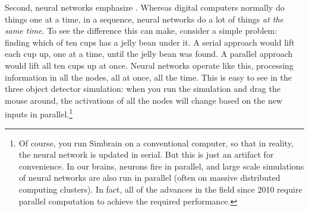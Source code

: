 Second, neural networks emphasize . Whereas digital computers normally do things one at a time, in a sequence, neural networks do a lot of things  \emph{at the same time}. To see the difference this can make, consider a simple problem: finding which of ten cups has a jelly bean under it. A serial approach would lift each cup up, one at a time, until the jelly bean was found. A parallel approach would lift all ten cups up at once. Neural networks operate like this, processing information in all the nodes, all at once, all the time. This is easy to see  in the three object detector simulation: when you run the simulation and drag the mouse around, the activations of all the nodes will change based on the new inputs in parallel.\footnote{Of course, you run Simbrain on a conventional computer, so that in reality, the neural network is updated in serial. But this is just an artifact for convenience. In our brains, neurons fire in parallel, and large scale simulations of neural networks are also run in parallel (often on massive distributed computing clusters). In fact, all of the advances in the field since 2010 require parallel computation to achieve the required performance.} 


